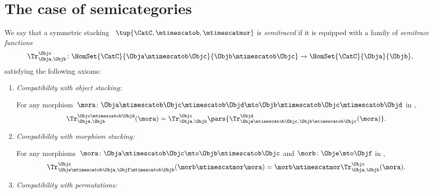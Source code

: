 
\section{The case of semicategories}

\begin{ctdefinition}
    \label{def:semitraced-assoc-stack-scat}
    We say that a symmetric stacking ~$\tup{\CatC, \mtimescatob, \mtimescatmor}$ is \emph{semitraced} if it is equipped with a family of \emph{semitrace functions}
    \begin{equation}
        \Tr_{\Obja,\Objb}^\Objc\colon \HomSet{\CatC}{\Obja \mtimescatob \Objc}{\Objb\mtimescatob \Objc}\to \HomSet{\CatC}{\Obja}{\Objb},
    \end{equation}
    satisfying the following axioms:
    \begin{enumerate}

        \item \emph{Compatibility with object stacking:}

              For any morphism~$\mora \colon \Obja\mtimescatob \Objc \mtimescatob \Objd \mto \Objb\mtimescatob \Objc \mtimescatob \Objd$ in \CatC,
              \begin{equation}
                  \label{eq:semicat-semitrace-vanishing_2}
                  \Tr_{\Obja,\Objb}^{\Objc\mtimescatob \Objd}(\mora)=\Tr_{\Obja,\Objb}^\Objc\pars{
                      \Tr_{\Obja \mtimescatob \Objc, \Objb \mtimescatob \Objc}^\Objd(\mora)}.
              \end{equation}

        \item \emph{Compatibility with morphism stacking:}

              For any morphisms~$\mora\colon \Obja\mtimescatob \Objc \mto \Objb\mtimescatob \Objc$ and $\morb \colon \Obje \mto \Objf$ in \CatC,
              \begin{equation}
                  \label{eq:semicat-semitrace-superposing}
                  \Tr_{\Obje\mtimescatob \Obja,\Objf\mtimescatob \Objb}^{\Objc}(\morb \mtimescatmor \mora)=\morb \mtimescatmor \Tr_{\Obja,\Objb}^\Objc(\mora).
              \end{equation}

        \item \emph{Compatibility with permutations:}


    \end{enumerate}
\end{ctdefinition}

